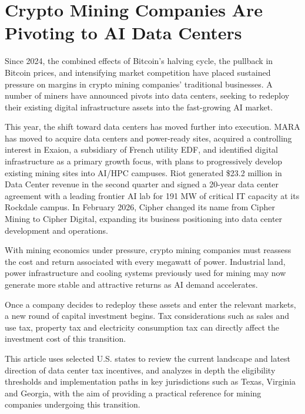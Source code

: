 \section{Crypto Mining Companies Are Pivoting to AI Data Centers}

Since 2024, the combined effects of Bitcoin's halving cycle, the pullback in Bitcoin prices, and intensifying market competition have placed sustained pressure on margins in crypto mining companies' traditional businesses. A number of miners have announced pivots into data centers, seeking to redeploy their existing digital infrastructure assets into the fast-growing AI market.

This year, the shift toward data centers has moved further into execution. MARA has moved to acquire data centers and power-ready sites, acquired a controlling interest in Exaion, a subsidiary of French utility EDF, and identified digital infrastructure as a primary growth focus, with plans to progressively develop existing mining sites into AI/HPC campuses. Riot generated \$23.2 million in Data Center revenue in the second quarter and signed a 20-year data center agreement with a leading frontier AI lab for 191 MW of critical IT capacity at its Rockdale campus. In February 2026, Cipher changed its name from Cipher Mining to Cipher Digital, expanding its business positioning into data center development and operations.

With mining economics under pressure, crypto mining companies must reassess the cost and return associated with every megawatt of power. Industrial land, power infrastructure and cooling systems previously used for mining may now generate more stable and attractive returns as AI demand accelerates.

Once a company decides to redeploy these assets and enter the relevant markets, a new round of capital investment begins. Tax considerations such as sales and use tax, property tax and electricity consumption tax can directly affect the investment cost of this transition.

This article uses selected U.S. states to review the current landscape and latest direction of data center tax incentives, and analyzes in depth the eligibility thresholds and implementation paths in key jurisdictions such as Texas, Virginia and Georgia, with the aim of providing a practical reference for mining companies undergoing this transition.

\FloatBarrier
